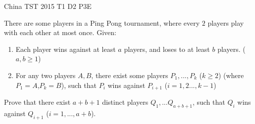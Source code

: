 {China TST 2015 T1 D2 P3}{E}{
    There are some players in a Ping Pong tournament, where
    every $2$ players play with each other at most once. Given: \vspace{-.9em}
    \begin{enumerate}  
        \item Each player wins against at least $a$ players, and loses to at
            least $b$ players. ($a,b\geq 1$) 
        \item For any two players $A,B$, there exist some players
            $P_1,...,P_k$ ($k\geq 2$) (where $P_1=A$,$P_k=B$), such that $P_i$
            wins against $P_{i+1}$ ($i=1,2...,k-1$) 
    \end{enumerate} 
    \vspace{-.9em} 

    Prove that there exist $a+b+1$ distinct players $Q_1,...Q_{a+b+1}$, such that
    $Q_i$ wins against $Q_{i+1}$ ($i=1,...,a+b$).

}



